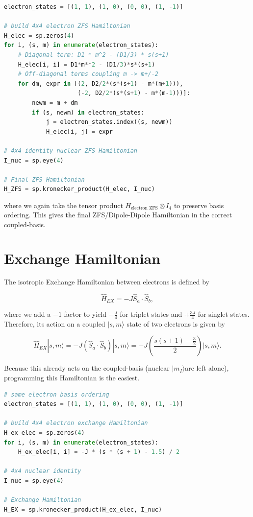 \documentclass[svgnames]{article}
\begin{document}
\begin{lstlisting}[language=Python] 
electron_states = [(1, 1), (1, 0), (0, 0), (1, -1)]

# build 4x4 electron ZFS Hamiltonian 
H_elec = sp.zeros(4)
for i, (s, m) in enumerate(electron_states):
    # Diagonal term: D1 * m^2 - (D1/3) * s(s+1)
    H_elec[i, i] = D1*m**2 - (D1/3)*s*(s+1)
    # Off-diagonal terms coupling m -> m+/-2
    for dm, expr in [(2, D2/2*(s*(s+1) - m*(m+1))),
                     (-2, D2/2*(s*(s+1) - m*(m-1)))]:
        newm = m + dm
        if (s, newm) in electron_states:
            j = electron_states.index((s, newm))
            H_elec[i, j] = expr

# 4x4 identity nuclear ZFS Hamiltonian 
I_nuc = sp.eye(4)

# Final ZFS Hamiltonian 
H_ZFS = sp.kronecker_product(H_elec, I_nuc)
\end{lstlisting} 

where we again take the tensor product $H_\text{electron ZFS} \otimes I_4$ to preserve basis ordering. This gives the final ZFS/Dipole-Dipole
Hamiltonian in the correct coupled-basis. 

\newpage
\section{Exchange Hamiltonian}

The isotropic Exchange Hamiltonian between electrons is defined by 

\[
    \hat{H}_{EX} = -J \hat{S}_a \cdot \hat{S}_b,
\] \vspace{3px}

where we add a $-1$ factor to yield $-\frac{J}{4}$ for triplet states and
$+\frac{3J}{4}$ for singlet states. Therefore, its action on a coupled $|s, m\rangle$ state of two electrons is
given by 

\[
    \hat{H}_{EX} |s, m\rangle = -J \left( \hat{S}_a \cdot \hat{S}_b \right) |s,
    m\rangle = -J \left( \frac{s(s+1) - \frac{3}{2}}{2} \right) |s, m\rangle.  
\] \vspace{3px}

Because this already acts on the coupled-basis (nuclear $|m_I\rangle $are left
alone), programming this Hamiltonian is the easiest. 

\begin{lstlisting}[language=Python] 
# same electron basis ordering
electron_states = [(1, 1), (1, 0), (0, 0), (1, -1)]

# build 4x4 electron exchange Hamiltonian 
H_ex_elec = sp.zeros(4)
for i, (s, m) in enumerate(electron_states):
    H_ex_elec[i, i] = -J * (s * (s + 1) - 1.5) / 2

# 4x4 nuclear identity 
I_nuc = sp.eye(4)

# Exchange Hamiltonian 
H_EX = sp.kronecker_product(H_ex_elec, I_nuc)
\end{lstlisting} 
\end{document}
